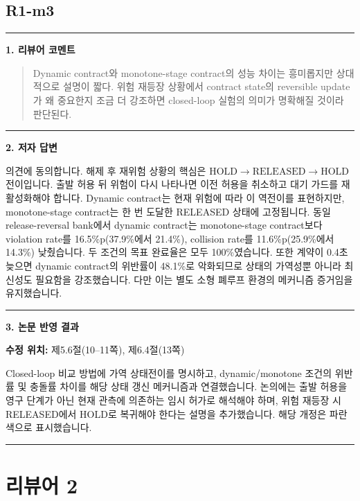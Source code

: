 \documentclass[11pt]{article}
\newcommand{\fieldheading}[2]{%
  \par\medskip\noindent
  {\color{#1}\rule{3pt}{1.25em}}\hspace{0.55em}\textbf{#2}\par\smallskip}
\newenvironment{reviewitem}[1]
  {\subsection*{#1}}
  {\par\medskip\hrule\bigskip}
\newenvironment{reviewercomment}
  {\fieldheading{reviewercolor}{1. 리뷰어 코멘트}%
   \begin{quote}}
  {\end{quote}}
\newenvironment{authorresponse}
  {\fieldheading{responsecolor}{2. 저자 답변}}
  {\par}
\newenvironment{manuscriptrevision}[1]
  {\fieldheading{revisioncolor}{3. 논문 반영 결과}%
   \textbf{수정 위치:} #1\par\smallskip}
  {\par}
\begin{document}
\begin{reviewitem}{R1-m3}
  \begin{reviewercomment}
    Dynamic contract와 monotone-stage contract의 성능 차이는 흥미롭지만 상대적으로
    설명이 짧다. 위험 재등장 상황에서 contract state의 reversible update가 왜
    중요한지 조금 더 강조하면 closed-loop 실험의 의미가 명확해질 것이라 판단된다.
  \end{reviewercomment}

  \begin{authorresponse}
    의견에 동의합니다. 해제 후 재위험 상황의 핵심은
    $\mathrm{HOLD}\rightarrow\mathrm{RELEASED}\rightarrow\mathrm{HOLD}$ 전이입니다.
    출발 허용 뒤 위험이 다시 나타나면 이전 허용을 취소하고 대기 가드를
    재활성화해야 합니다. Dynamic contract는 현재 위험에 따라 이 역전이를
    표현하지만, monotone-stage contract는 한 번 도달한 RELEASED 상태에 고정됩니다.
    동일 release-reversal bank에서 dynamic contract는 monotone-stage contract보다
    violation rate를 16.5\%p(37.9\%에서 21.4\%), collision rate를
    11.6\%p(25.9\%에서 14.3\%) 낮췄습니다. 두 조건의 목표 완료율은 모두
    100\%였습니다. 또한 계약이 0.4초 늦으면 dynamic contract의 위반률이
    48.1\%로 악화되므로 상태의 가역성뿐 아니라 최신성도 필요함을 강조했습니다.
    다만 이는 별도 소형 폐루프 환경의 메커니즘 증거임을 유지했습니다.
  \end{authorresponse}

  \begin{manuscriptrevision}{제5.6절(10--11쪽), 제6.4절(13쪽)}
    Closed-loop 비교 방법에 가역 상태전이를 명시하고, dynamic/monotone 조건의
    위반률 및 충돌률 차이를 해당 상태 갱신 메커니즘과 연결했습니다. 논의에는
    출발 허용을 영구 단계가 아닌 현재 관측에 의존하는 임시 허가로 해석해야 하며,
    위험 재등장 시 RELEASED에서 HOLD로 복귀해야 한다는 설명을 추가했습니다.
    해당 개정은 파란색으로 표시했습니다.
  \end{manuscriptrevision}
\end{reviewitem}

\clearpage
\section*{리뷰어 2}
\end{document}
